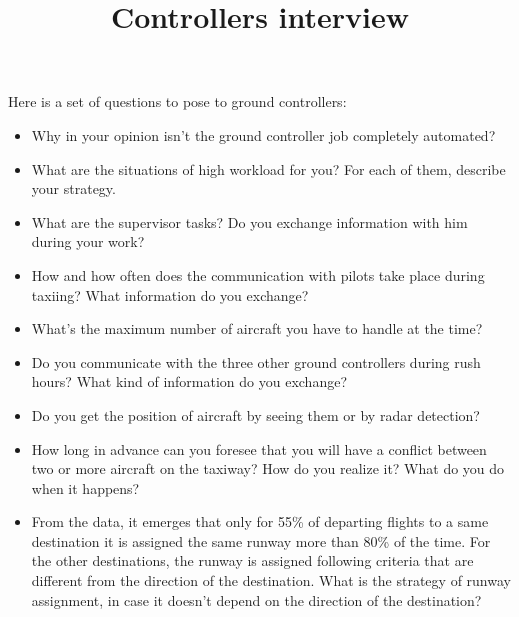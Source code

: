 \documentclass{article}
\begin{document}
		
	\title{Controllers interview}
	\maketitle
Here is a set of questions to pose to ground controllers:

\begin{itemize}
\item Why in your opinion isn't the ground controller job completely automated?
\item What are the situations of high workload for you? For each of them, describe your strategy.
\item What are the supervisor tasks? Do you exchange information with him during your work?
\item How and how often does the communication with pilots take place during taxiing? What information do you exchange?
\item What's the maximum number of aircraft you have to handle at the time?
\item Do you communicate with the three other ground controllers during rush hours? What kind of information do you exchange?
\item Do you get the position of aircraft by seeing them or by radar detection?
\item How long in advance can you foresee that you will have a conflict between two or more aircraft on the taxiway? How do you realize it? What do you do when it happens?
\item From the data, it emerges that only for 55\% of departing flights to a same destination it is assigned the same runway more than 80\% of the time. For the other destinations, the runway is assigned following criteria that are different from the direction of the destination. What is the strategy of runway assignment, in case it doesn't depend on the direction of the destination?
\end{itemize}
	
\end{document}
